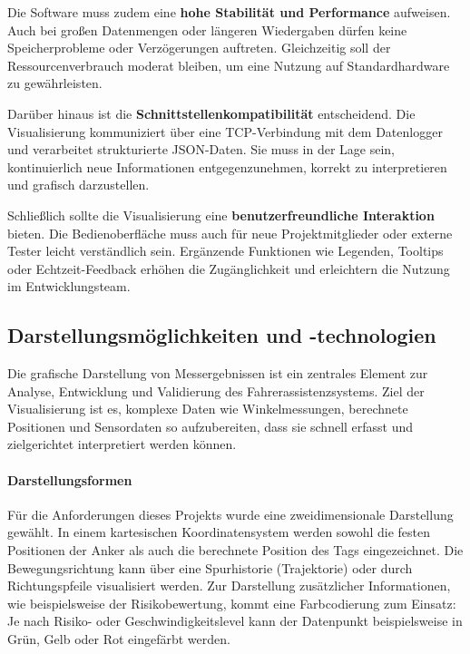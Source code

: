 \documentclass[a4paper, 12pt]{article} %
\begin{document}
Die Software muss zudem eine \textbf{hohe Stabilität und Performance} aufweisen. Auch bei großen Datenmengen oder längeren Wiedergaben dürfen keine 
Speicherprobleme oder Verzögerungen auftreten. Gleichzeitig soll der Ressourcenverbrauch moderat bleiben, um eine Nutzung auf Standardhardware zu 
gewährleisten.

Darüber hinaus ist die \textbf{Schnittstellenkompatibilität} entscheidend. Die Visualisierung kommuniziert über eine TCP-Verbindung mit dem Datenlogger 
und verarbeitet strukturierte \ac{JSON}-Daten. Sie muss in der Lage sein, kontinuierlich neue Informationen entgegenzunehmen, korrekt zu interpretieren und 
grafisch darzustellen.

Schließlich sollte die Visualisierung eine \textbf{benutzerfreundliche Interaktion} bieten. Die Bedienoberfläche muss auch für neue Projektmitglieder
 oder externe Tester leicht verständlich sein. Ergänzende Funktionen wie Legenden, Tooltips oder Echtzeit-Feedback erhöhen die Zugänglichkeit und 
 erleichtern die Nutzung im Entwicklungsteam.

\subsection{Darstellungsmöglichkeiten und -technologien}

Die grafische Darstellung von Messergebnissen ist ein zentrales Element zur Analyse, Entwicklung und Validierung des Fahrerassistenzsystems.
 Ziel der Visualisierung ist es, komplexe Daten wie Winkelmessungen, berechnete Positionen und Sensordaten so aufzubereiten, dass sie schnell
  erfasst und zielgerichtet interpretiert werden können.

\paragraph{Darstellungsformen}

Für die Anforderungen dieses Projekts wurde eine zweidimensionale Darstellung gewählt. In einem kartesischen Koordinatensystem werden sowohl 
die festen Positionen der Anker als auch die berechnete Position des Tags eingezeichnet. Die Bewegungsrichtung kann über eine Spurhistorie 
(Trajektorie) oder durch Richtungspfeile visualisiert werden. Zur Darstellung zusätzlicher Informationen, wie beispielsweise der Risikobewertung, 
kommt eine Farbcodierung zum Einsatz: Je nach Risiko- oder Geschwindigkeitslevel kann der Datenpunkt beispielsweise in Grün, Gelb oder Rot eingefärbt 
werden.
\end{document}
